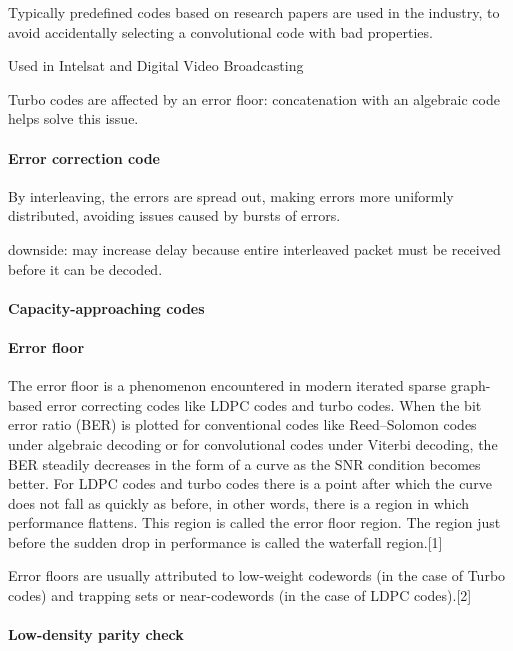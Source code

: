 \documentclass{article}
\begin{document}
Typically predefined codes based on research papers are used in the industry, to avoid accidentally selecting a convolutional code with bad properties.

Used in Intelsat and Digital Video Broadcasting

Turbo codes are affected by an error floor: concatenation with an algebraic code helps solve this issue.

\paragraph {Error correction code}

By interleaving, the errors are spread out, making errors more uniformly distributed, avoiding issues caused by bursts of errors.

downside: may increase delay because entire interleaved packet must be received before it can be decoded.

\paragraph{Capacity-approaching codes}

\paragraph{Error floor}

The error floor is a phenomenon encountered in modern iterated sparse graph-based error correcting codes like LDPC codes and turbo codes. When the bit error ratio (BER) is plotted for conventional codes like Reed–Solomon codes under algebraic decoding or for convolutional codes under Viterbi decoding, the BER steadily decreases in the form of a curve as the SNR condition becomes better. For LDPC codes and turbo codes there is a point after which the curve does not fall as quickly as before, in other words, there is a region in which performance flattens. This region is called the error floor region. The region just before the sudden drop in performance is called the waterfall region.[1]

Error floors are usually attributed to low-weight codewords (in the case of Turbo codes) and trapping sets or near-codewords (in the case of LDPC codes).[2]

\paragraph{Low-density parity check}
\end{document}
